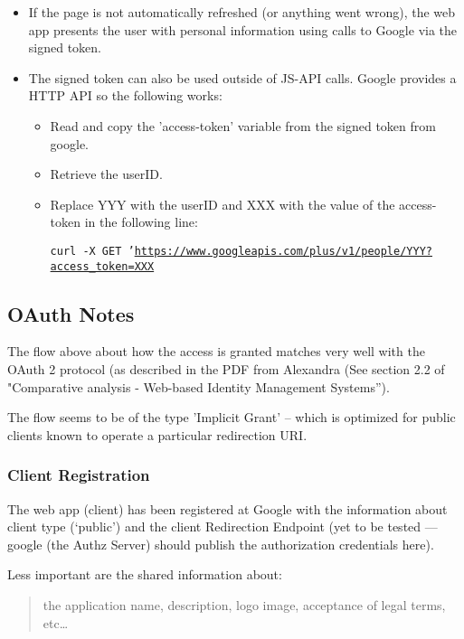 \documentclass[12pt, a4paper]{article}
\begin{document}
\begin{itemize}
\begin{itemize}
      \item If the page is not automatically refreshed (or anything went
        wrong), the web app presents the user with personal information
        using calls to Google via the signed token.
      \item The signed token can also be used outside of JS-API calls.
        Google provides a HTTP API so the following works:
        \begin{itemize}
          \item Read and copy the 'access-token' variable from the
            signed token from google.
          \item Retrieve the userID.
          \item Replace YYY with the userID and XXX with the value of
            the access-token in the following line:

            {\tt curl -X GET
              '\url{https://www.googleapis.com/plus/v1/people/YYY?access\_token=XXX}}
        \end{itemize}
    \end{itemize}
\end{itemize}

\subsection*{OAuth Notes}
The flow above about how the access is granted matches very well with
the OAuth 2 protocol (as described in the PDF from Alexandra (See
section 2.2 of "Comparative analysis - Web-based Identity Management
Systems”).

The flow seems to be of the type 'Implicit Grant' – which is optimized
for public clients known to operate a particular redirection URI.

\subsubsection*{Client Registration}
The web app (client) has been registered at Google with the information
about client type (‘public') and the client Redirection Endpoint (yet to
be tested — google (the Authz Server) should publish the authorization
credentials here).

Less important are the shared information about:

\begin{quote}the application name, description, logo image, acceptance
  of legal terms, etc…\end{quote}
\end{document}
